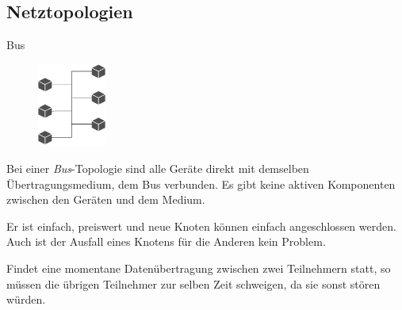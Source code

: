 \subsection{Netztopologien}

\begin{defi}{Bus}
    \begin{figure}
        \centering
        \includegraphics[width=0.2\textwidth]{includes/figures/defi_bus.pdf}
    \end{figure}%
    Bei einer \emph{Bus}-Topologie sind alle Geräte direkt mit demselben Übertragungsmedium, dem Bus verbunden.
    Es gibt keine aktiven Komponenten zwischen den Geräten und dem Medium.

    Er ist einfach, preiswert und neue Knoten können einfach angeschlossen werden.
    Auch ist der Ausfall eines Knotens für die Anderen kein Problem.

    Findet eine momentane Datenübertragung zwischen zwei Teilnehmern statt, so müssen die übrigen Teilnehmer zur selben Zeit schweigen, da sie sonst stören würden.
\end{defi}

